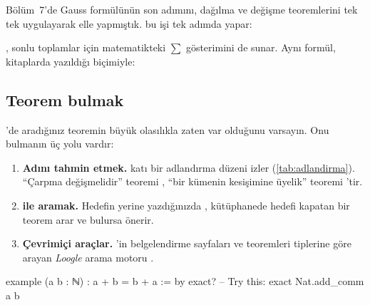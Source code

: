 Bölüm~7'de Gauss formülünün son adımını, dağılma ve değişme teoremlerini
tek tek uygulayarak elle yapmıştık.  bu işi tek adımda
yapar:


\noindent \Mathlib{}, sonlu toplamlar için matematikteki $\sum$
gösterimini de sunar. Aynı formül, kitaplarda yazıldığı biçimiyle:


\subsection{Teorem bulmak}

\Mathlib{}'de aradığınız teoremin büyük olasılıkla zaten var olduğunu
varsayın. Onu bulmanın üç yolu vardır:

\begin{enumerate}[adimlar]
  \item \textbf{Adını tahmin etmek.} \Mathlib{} katı bir adlandırma
        düzeni izler (\cref{tab:adlandirma}). ``Çarpma değişmelidir''
        teoremi , ``bir kümenin kesişimine üyelik'' teoremi
        'tir.
  \item \textbf{ ile aramak.} Hedefin yerine 
        yazdığınızda \Lean{}, kütüphanede hedefi kapatan bir teorem arar
        ve bulursa önerir.
  \item \textbf{Çevrimiçi araçlar.} \Mathlib{}'in belgelendirme
        sayfaları ve teoremleri tiplerine göre arayan \emph{Loogle}
        arama motoru \citep{loogle}.
\end{enumerate}

\begin{leankod}
example (a b : ℕ) : a + b = b + a := by
  exact?   -- Try this: exact Nat.add_comm a b
\end{leankod}

